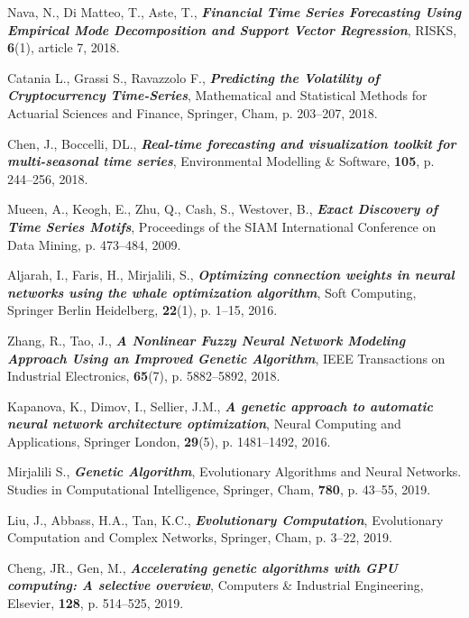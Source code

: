 \documentclass[graybox]{svmult}
\begin{document}
\begin{thebibliography}{99}

 Nava, N., Di Matteo, T., Aste, T., \textbf{\textit{Financial Time Series Forecasting Using Empirical Mode Decomposition and Support Vector Regression}}, RISKS, \textbf{6}(1), article 7, 2018.

 Catania L., Grassi S., Ravazzolo F., \textbf{\textit{Predicting the Volatility of Cryptocurrency Time-Series}}, Mathematical and Statistical Methods for Actuarial Sciences and Finance, Springer, Cham, p. 203--207, 2018.

 Chen, J., Boccelli, DL., \textbf{\textit{Real-time forecasting and visualization toolkit for multi-seasonal time series}}, Environmental Modelling \& Software, \textbf{105}, p. 244--256, 2018.

 Mueen, A., Keogh, E., Zhu, Q., Cash, S., Westover, B., \textbf{\textit{Exact Discovery of Time Series Motifs}}, Proceedings of the SIAM International Conference on Data Mining, p. 473--484, 2009.

 Aljarah, I., Faris, H., Mirjalili, S., \textbf{\textit{Optimizing connection weights in neural networks using the whale optimization algorithm}}, Soft Computing, Springer Berlin Heidelberg, \textbf{22}(1), p. 1--15, 2016.

 Zhang, R., Tao, J., \textbf{\textit{A Nonlinear Fuzzy Neural Network Modeling Approach Using an Improved Genetic Algorithm}}, IEEE Transactions on Industrial Electronics, \textbf{65}(7), p. 5882--5892, 2018.

 Kapanova, K., Dimov, I., Sellier, J.M., \textbf{\textit{A genetic approach to automatic neural network architecture optimization}}, Neural Computing and Applications, Springer London, \textbf{29}(5), p. 1481--1492, 2016.

 Mirjalili S., \textbf{\textit{Genetic Algorithm}}, Evolutionary Algorithms and Neural Networks. Studies in Computational Intelligence, Springer, Cham, \textbf{780}, p. 43--55, 2019.

 Liu, J., Abbass, H.A., Tan, K.C., \textbf{\textit{Evolutionary Computation}}, Evolutionary Computation and Complex Networks, Springer, Cham, p. 3--22, 2019.

 Cheng, JR., Gen, M., \textbf{\textit{Accelerating genetic algorithms with GPU computing: A selective overview}}, Computers \& Industrial Engineering, Elsevier, \textbf{128}, p. 514--525, 2019.


\end{thebibliography}
\end{document}
